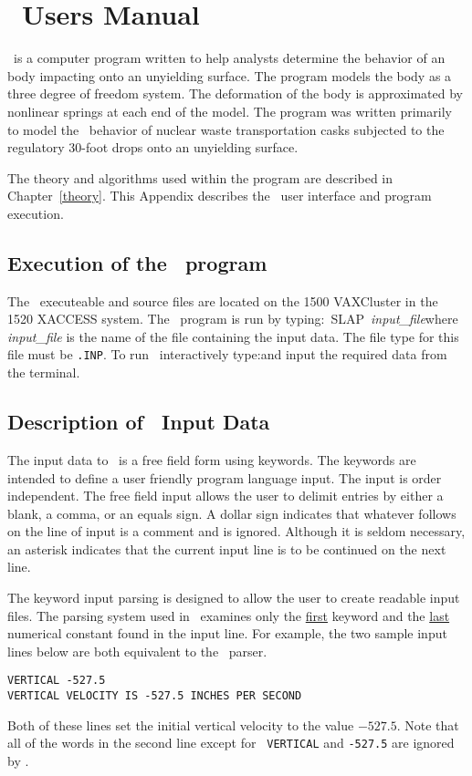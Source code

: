 \chapter{\SLAP\ Users Manual}

\SLAP\  is a computer program written to help analysts determine the
behavior of an body impacting onto an unyielding surface.  The program
models the body as a three degree of freedom system.  The deformation of
the body is approximated by nonlinear springs at each end of the model.
The program was written primarily to model the \SLAP\  behavior of
nuclear waste transportation casks subjected to the regulatory 30-foot
drops onto an unyielding surface. 

The theory and algorithms used within the program are described in
Chapter~\ref{theory}.  This Appendix describes the \SLAP\ user interface
and program execution. 

\section{Execution of the \SLAP\  program}

The \SLAP\ executeable and source files are located on the 1500
VAXCluster in the 1520 {\sf XACCESS} system. The \SLAP\ program is run
by typing:\hbox{\ {\sf SLAP }{\em input\_file}}\quad where {\em
input\_file} is the name of the file containing the input data.  The
file type for this file must be {\tt .INP}. To run \SLAP\ interactively
type:\quad and input the required data from the terminal. 

\section{Description of \SLAP\  Input Data}

The input data to \SLAP\ is a free field form using keywords.  The
keywords are intended to define a user friendly program language input.
The input is order independent.  The free field input allows the user to
delimit entries by either a blank, a comma, or an equals sign.  A dollar
sign indicates that whatever follows on the line of input is a comment
and is ignored.  Although it is seldom necessary, an asterisk indicates
that the current input line is to be continued on the next line. 

The keyword input parsing is designed to allow the user to create
readable input files.  The parsing system used in \SLAP\ examines only
the \underline{first} keyword and the \underline{last} numerical
constant found in the input line.  For example, the two sample input
lines below are both equivalent to the \SLAP\ parser. 
\begin{verbatim}
VERTICAL -527.5
VERTICAL VELOCITY IS -527.5 INCHES PER SECOND
\end{verbatim}
Both of these lines set the initial vertical velocity to the value
$-527.5$.  Note that all of the words in the second line except for {\tt
VERTICAL} and {\tt -527.5} are ignored by \SLAP. 

